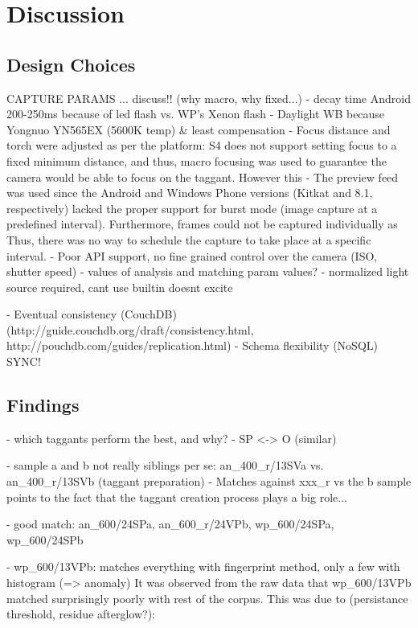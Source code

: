 \documentclass[thesis.tex]{subfiles}
\begin{document}
\chapter{Discussion}
\label{chapter:discussion}

\section{Design Choices}

CAPTURE PARAMS ... discuss!! (why macro, why fixed...)
- decay time Android 200-250ms because of led flash vs. WP's Xenon flash
- Daylight WB because Yongnuo YN565EX (5600K temp) \& least compensation
- Focus distance and torch were adjusted as per the platform: S4 does not support setting focus to a fixed minimum distance, and thus, macro focusing was used to guarantee the camera would be able to focus on the taggant. However this
- The preview feed was used since the Android and Windows Phone versions (Kitkat and 8.1, respectively) lacked the proper support for burst mode (image capture at a predefined interval). Furthermore, frames could not be captured individually as Thus, there was no way to schedule the capture to take place at a specific interval.
- Poor API support, no fine grained control over the camera (ISO, shutter speed)
- values of analysis and matching param values?
- normalized light source required, cant use builtin doesnt excite

- Eventual consistency (CouchDB) (http://guide.couchdb.org/draft/consistency.html, http://pouchdb.com/guides/replication.html)
- Schema flexibility (NoSQL) SYNC!


\section{Findings}
- which taggants perform the best, and why?
- SP <-> O (similar)

- sample a and b not really siblings per se: an\_400\_r/13SVa vs. an\_400\_r/13SVb (taggant preparation)
- Matches against xxx\_r vs the b sample points to the fact that the taggant creation process plays a big role...

- good match: an\_600/24SPa, an\_600\_r/24VPb, wp\_600/24SPa, wp\_600/24SPb

- wp\_600/13VPb: matches everything with fingerprint method, only a few with histogram (=> anomaly)
It was observed from the raw data that wp\_600/13VPb matched surprisingly poorly with rest of the corpus. This was due to (persistance threshold, residue afterglow?):
\end{document}
